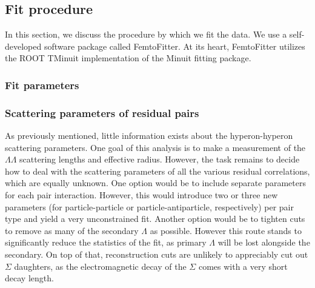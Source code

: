 \subsection{Fit procedure}
\label{sec:FitProcedure}

In this section, we discuss the procedure by which we fit the data.
We use a self-developed software package called FemtoFitter.
At its heart, FemtoFitter utilizes the ROOT TMinuit implementation of the Minuit fitting package.






\subsubsection{Fit parameters}
% 


\subsubsection{Scattering parameters of residual pairs}
\label{sec:ScatteringParams}


As previously mentioned, little information exists about the hyperon-hyperon scattering parameters.  
One goal of this analysis is to make a measurement of the $\Lambda\Lambda$ scattering lengths and effective radius.  
However, the task remains to decide how to deal with the scattering parameters of all the various residual correlations, which are equally unknown.  
One option would be to include separate parameters for each pair interaction.  
However, this would introduce two or three new parameters (for particle-particle or particle-antiparticle, respectively) per pair type and yield a very unconstrained fit.  
Another option would be to tighten cuts to remove as many of the secondary $\Lambda$ as possible.  However this route stands to significantly reduce the statistics of the fit, as primary $\Lambda$ will be lost alongside the secondary.  
On top of that, reconstruction cuts are unlikely to appreciably cut out $\Sigma$ daughters, as the electromagnetic decay of the $\Sigma$ comes with a very short decay length.

